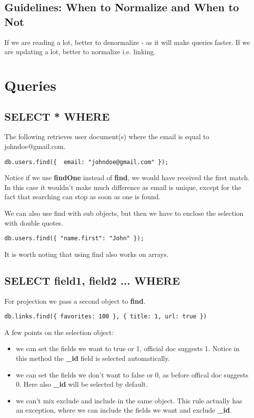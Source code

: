 \documentclass[a4paper, 12pt]{article}
\begin{document}
\subsection{Guidelines: When to Normalize and When to Not}
If we are reading a lot, better to denormalize - as it will make queries faster. If we are updating a lot, better to normalize i.e. linking.

\section{Queries}
\subsection{SELECT * WHERE}
The following retrieves user document(s) where the email is equal to johndoe@gmail.com.
\begin{verbatim}
db.users.find({  email: "johndoe@gmail.com" });
\end{verbatim}
Notice if we use \textbf{findOne} instead of \textbf{find}, we would have received the first match. In this case it wouldn't make much difference as email is unique, except for the fact that searching can stop as soon as one is found.

We can also use find with sub objects, but then we have to enclose the selection with double quotes.
\begin{verbatim}
db.users.find({ "name.first": "John" });
\end{verbatim}

It is worth noting that using find also works on arrays.
\subsection{SELECT field1, field2 ... WHERE}
For projection we pass a second object to \textbf{find}.
\begin{verbatim}
db.links.find({ favorites: 100 }, { title: 1, url: true })
\end{verbatim}
A few points on the selection object:
\begin{itemize}
    \item we can set the fields we want to true or 1, official doc suggests 1. Notice in this method the \textbf{\_id} field is selected automatically. 
    \item we can set the fields we don't want to false or 0, as before offical doc suggests 0. Here also \textbf{\_id} will be selected by default.
    \item we can't mix exclude and include in the same object. This rule actually has an exception, where we can include the fields we want and exclude \textbf{\_id}.
\end{itemize}
\end{document}

